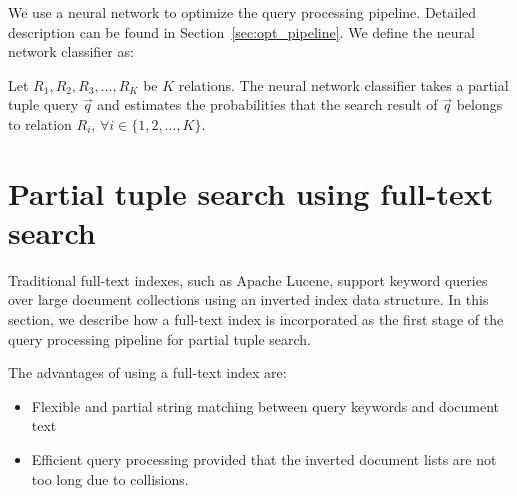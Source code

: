 We use a neural network to optimize the query processing pipeline. Detailed description can be found in  Section~\ref{sec:opt_pipeline}. We define the neural network classifier as:

\begin{definition}
	Let $R_1, R_2, R_3, \dots, R_K$ be $K$ relations. The neural network classifier takes a partial tuple query $\vec q$ and estimates the probabilities that the search result of $\vec q$ belongs to relation $R_i$, $\forall i \in \{1, 2, \dots, K\}$.

 
\end{definition}


\section{Partial tuple search using full-text search}
\label{sec:search_fulltext_index}
Traditional full-text indexes, such as Apache Lucene, support keyword queries over large document collections using an inverted index data structure.  In this section, we describe how a full-text index is incorporated as the first stage of the query processing pipeline for partial tuple search.

The advantages of using a full-text index are:

\begin{itemize}
    \item Flexible and partial string matching between query keywords and document text
    \item Efficient query processing provided that the inverted document lists are not too long due to collisions.
\end{itemize}

